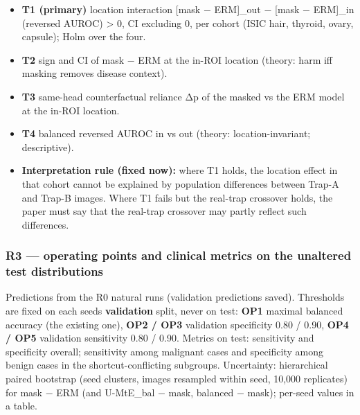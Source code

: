 {\begin{itemize}

\item
  \textbf{T1 (primary)} location interaction {[}mask − ERM{]}\_out − {[}mask − ERM{]}\_in (reversed AUROC) \textgreater{} 0, CI excluding 0,
  per cohort (ISIC hair, thyroid, ovary, capsule); Holm over the four.
\item
  \textbf{T2} sign and CI of mask − ERM at the in-ROI location (theory: harm iff masking removes disease context).
\item
  \textbf{T3} same-head counterfactual reliance \textbar Δp\textbar{} of the masked vs the ERM model at the in-ROI location.
\item
  \textbf{T4} balanced reversed AUROC in vs out (theory: location-invariant; descriptive).
\item
  \textbf{Interpretation rule (fixed now):} where T1 holds, the location effect in that cohort cannot be explained by
  population differences between Trap-A and Trap-B images. Where T1 fails but the real-trap crossover holds, the
  paper must say that the real-trap crossover may partly reflect such differences.
\end{itemize}

\subsubsection{R3 --- operating points and clinical metrics on the unaltered test distributions}\label{r3--operating-points-and-clinical-metrics-on-the-unaltered-test-distributions}

Predictions from the R0 natural runs (validation predictions saved). Thresholds are fixed on each seed\textquotesingle s
\textbf{validation} split, never on test: \textbf{OP1} maximal balanced accuracy (the existing one), \textbf{OP2 / OP3} validation
specificity 0.80 / 0.90, \textbf{OP4 / OP5} validation sensitivity 0.80 / 0.90. Metrics on test: sensitivity and
specificity overall; sensitivity among malignant cases and specificity among benign cases in the
shortcut-conflicting subgroups. Uncertainty: hierarchical paired bootstrap (seed clusters, images resampled within
seed, 10,000 replicates) for mask − ERM (and U-MtE\_bal − mask, balanced − mask); per-seed values in a table.

\begin{itemize}


\end{itemize}}
